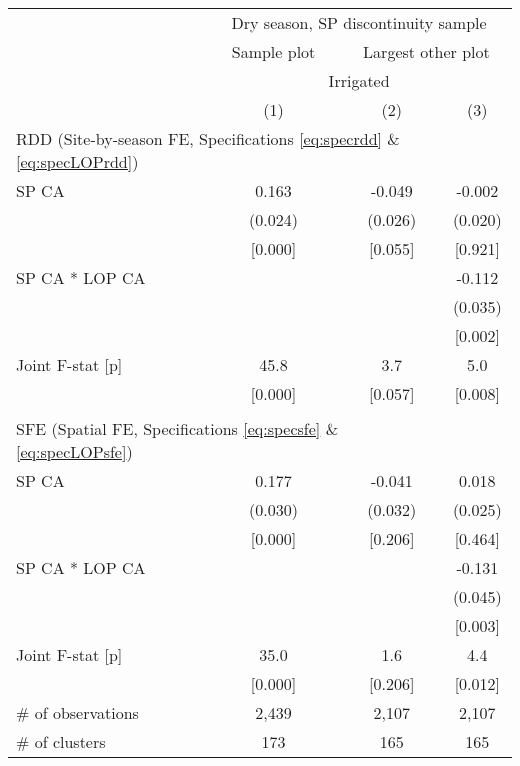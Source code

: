 \begin{tabular}{lccc}
\hline \hline
 & \multicolumn{3}{c}{Dry season, SP discontinuity sample} \\
\cmidrule(lr){2-4}
 & Sample plot & \multicolumn{2}{c}{Largest other plot} \\
\cmidrule(lr){2-2}\cmidrule(lr){3-4}
 & \multicolumn{3}{c}{Irrigated} \\
\cmidrule(lr){2-4}
 & (1) & (2) & (3) \\
\hline
\multicolumn{3}{l}{RDD (Site-by-season FE, Specifications \ref{eq:specrdd} \& \ref{eq:specLOPrdd})} & \\
\cmidrule(lr){1-3}
SP CA & 0.163 & -0.049\hphantom{-} & -0.002\hphantom{-} \\
 & (0.024) & (0.026) & (0.020) \\
 & [0.000] & [0.055] & [0.921] \\
SP CA * LOP CA &  &  & -0.112\hphantom{-} \\
 &  &  & (0.035) \\
 &  &  & [0.002] \\
Joint F-stat [p] & 45.8 & 3.7 & 5.0 \\
 & [0.000] & [0.057] & [0.008] \\
\\[-0.5em]
\multicolumn{3}{l}{SFE (Spatial FE, Specifications \ref{eq:specsfe} \& \ref{eq:specLOPsfe})} & \\
\cmidrule(lr){1-3}
SP CA & 0.177 & -0.041\hphantom{-} & 0.018 \\
 & (0.030) & (0.032) & (0.025) \\
 & [0.000] & [0.206] & [0.464] \\
SP CA * LOP CA &  &  & -0.131\hphantom{-} \\
 &  &  & (0.045) \\
 &  &  & [0.003] \\
Joint F-stat [p] & 35.0 & 1.6 & 4.4 \\
 & [0.000] & [0.206] & [0.012] \\
\hline
\# of observations & 2,439 & 2,107 & 2,107 \\
\# of clusters & 173 & 165 & 165 \\
\hline
\end{tabular}
